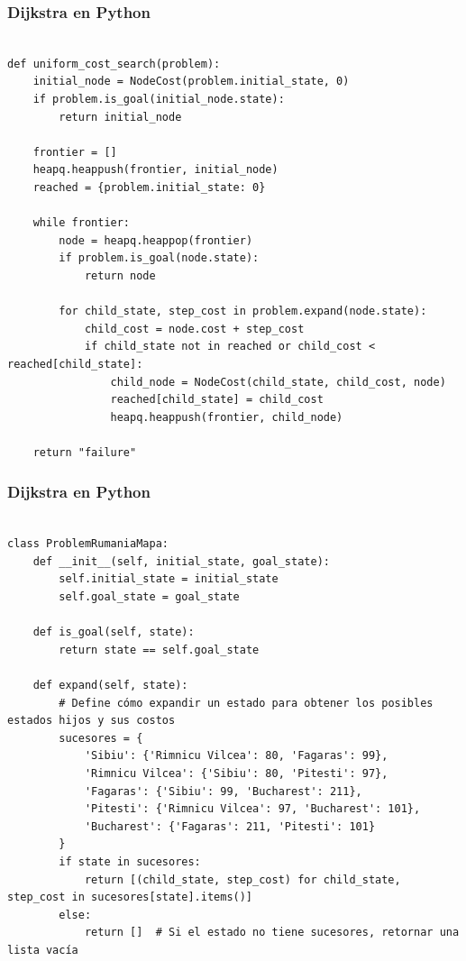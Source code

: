 \documentclass[xcolor=table]{beamer}
\begin{document}
\begin{frame} [fragile ]\frametitle{Dijkstra  en Python } \footnotesize
\begin{verbatim}

def uniform_cost_search(problem):
    initial_node = NodeCost(problem.initial_state, 0)
    if problem.is_goal(initial_node.state):
        return initial_node

    frontier = []
    heapq.heappush(frontier, initial_node)
    reached = {problem.initial_state: 0}

    while frontier:
        node = heapq.heappop(frontier)
        if problem.is_goal(node.state):
            return node

        for child_state, step_cost in problem.expand(node.state):
            child_cost = node.cost + step_cost
            if child_state not in reached or child_cost < reached[child_state]:
                child_node = NodeCost(child_state, child_cost, node)
                reached[child_state] = child_cost
                heapq.heappush(frontier, child_node)

    return "failure"
\end{verbatim}

\end{frame} 


\begin{frame} [fragile ]\frametitle{Dijkstra  en Python } \footnotesize
\begin{verbatim}

class ProblemRumaniaMapa:
    def __init__(self, initial_state, goal_state):
        self.initial_state = initial_state
        self.goal_state = goal_state

    def is_goal(self, state):
        return state == self.goal_state

    def expand(self, state):
        # Define cómo expandir un estado para obtener los posibles estados hijos y sus costos
        sucesores = {
            'Sibiu': {'Rimnicu Vilcea': 80, 'Fagaras': 99},
            'Rimnicu Vilcea': {'Sibiu': 80, 'Pitesti': 97},
            'Fagaras': {'Sibiu': 99, 'Bucharest': 211},
            'Pitesti': {'Rimnicu Vilcea': 97, 'Bucharest': 101},
            'Bucharest': {'Fagaras': 211, 'Pitesti': 101}
        }
        if state in sucesores:
            return [(child_state, step_cost) for child_state, step_cost in sucesores[state].items()]
        else:
            return []  # Si el estado no tiene sucesores, retornar una lista vacía

\end{verbatim}

\end{frame} 
\end{document}
